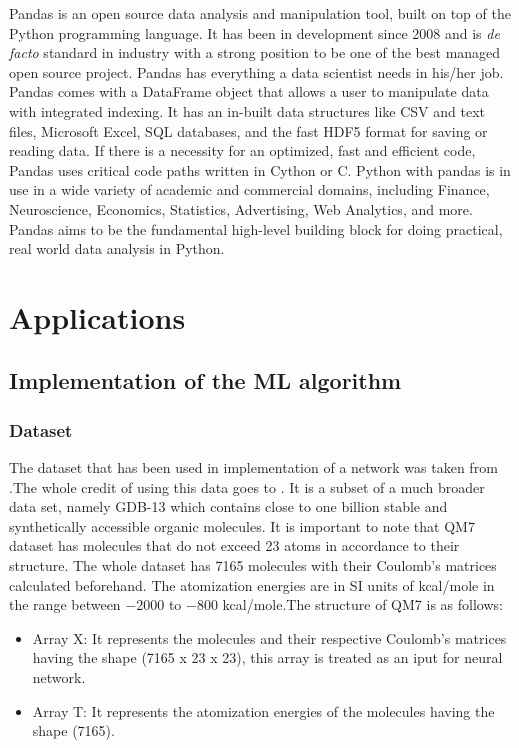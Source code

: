\documentclass[a4paper,oneside,openright,11pt]{book}
\begin{document}
Pandas \cite{pandas} is an open source data analysis and manipulation tool, built on top of the Python programming language. It has been in development since 2008 and is \emph{de facto} standard in industry with a strong position to be one of the best managed open source project. Pandas has everything a data scientist needs in his/her job. Pandas comes with a DataFrame object that allows a user to manipulate data with integrated indexing. It has an in-built data structures like CSV and text files, Microsoft Excel, SQL databases, and the fast HDF5 format for saving or reading data. If there is a necessity for an optimized, fast and efficient code, Pandas uses critical code paths written in Cython or C. Python with pandas is in use in a wide variety of academic and commercial domains, including Finance, Neuroscience, Economics, Statistics, Advertising, Web Analytics, and more. Pandas aims to be the fundamental high-level building block for doing practical, real world data analysis in Python.




\part{Applications}

\chapter{Implementation of the ML algorithm}

\section{Dataset}

The dataset that has been used in implementation of a network was taken from \cite{dataset}.The whole credit of using this data goes to \cite{blum} \cite{rupp}. It is a subset of a much broader data set, namely GDB-13 which contains close to one billion stable and synthetically accessible organic molecules. It is important to note that QM7 dataset has molecules that do not exceed 23 atoms in accordance to their structure. The whole dataset has 7165 molecules with their Coulomb's matrices calculated beforehand. The atomization energies are in SI units of kcal/mole in the range between $-2000$ to $-800$ kcal/mole.The structure of QM7 is as follows:

\begin{itemize}
    \item Array X: It represents the molecules and their respective Coulomb's matrices having the shape (7165 x 23 x 23), this array is treated as an iput for neural network.
    \item Array T: It represents the atomization energies of the molecules having the shape (7165).
\end{itemize}
\end{document}
